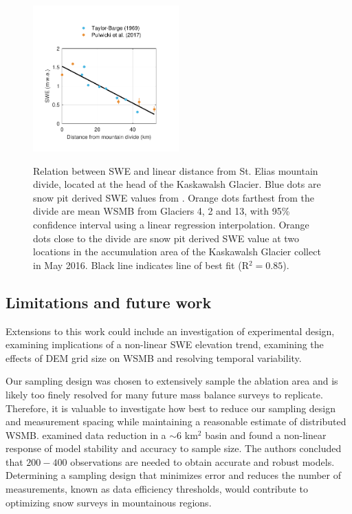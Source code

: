 \documentclass[review,oneside, letterpaper]{igs}
\begin{document}
\begin{figure}
	\centering
	\includegraphics[width =0.5\textwidth]{AccumGrad.pdf}\\
	\caption{Relation between SWE and linear distance from St. Elias mountain divide, located at the head of the Kaskawalsh Glacier. Blue dots are snow pit derived SWE values from \citep{Taylor1969}. Orange dots farthest from the divide are mean WSMB from Glaciers 4, 2 and 13, with 95\% confidence interval using a linear regression interpolation. Orange dots close to the divide are snow pit derived SWE value at two locations in the accumulation area of the Kaskawalsh Glacier collect in May 2016. Black line indicates line of best fit (R$^2=0.85$).}
	\label{fig:AccumGrad}
\end{figure}


\subsection{Limitations and future work}

Extensions to this work could include an investigation of experimental design, examining implications of a non-linear SWE elevation trend, examining the effects of DEM grid size on WSMB and resolving temporal variability. 

Our sampling design was chosen to extensively sample the ablation area and is likely too finely resolved for many future mass balance surveys to replicate. Therefore, it is valuable to investigate how best to reduce our sampling design and measurement spacing while maintaining a reasonable estimate of distributed WSMB. \cite{Lopez2010} examined data reduction in a $\sim$6 km$^2$ basin and found a non-linear response of model stability and accuracy to sample size. The authors concluded that $200-400$ observations are needed to obtain accurate and robust models. Determining a sampling design that minimizes error and reduces the number of measurements, known as data efficiency thresholds, would contribute to optimizing snow surveys in mountainous regions. 
\end{document}
